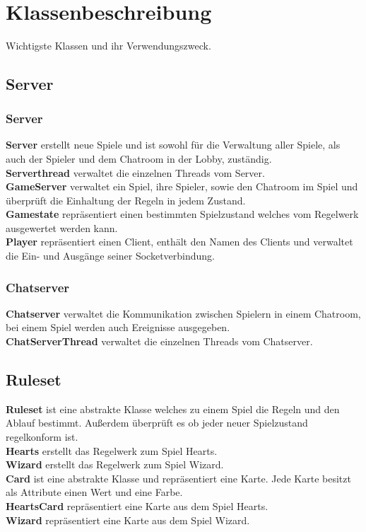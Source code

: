 \documentclass{article}
\begin{document}
\ \\
\section{Klassenbeschreibung}
Wichtigste Klassen und ihr Verwendungszweck.
	\subsection{Server}
		\subsubsection{Server}
			\textbf{Server} erstellt neue Spiele und ist sowohl für die Verwaltung aller Spiele, als auch der Spieler und dem Chatroom in der Lobby, zuständig. \\
			\textbf{Serverthread} verwaltet die einzelnen Threads vom Server. \\
			\textbf{GameServer} verwaltet ein Spiel, ihre Spieler, sowie den Chatroom im Spiel und überprüft die Einhaltung der Regeln in jedem Zustand. \\
			\textbf{Gamestate} repräsentiert einen bestimmten  Spielzustand welches vom Regelwerk ausgewertet werden kann.\\
			\textbf{Player} repräsentiert einen Client, enthält den Namen des Clients und verwaltet die Ein- und Ausgänge seiner Socketverbindung. \\
		\subsubsection{Chatserver}
			\textbf{Chatserver} verwaltet die Kommunikation zwischen Spielern in einem Chatroom, bei einem Spiel werden auch Ereignisse ausgegeben. \\
			\textbf{ChatServerThread} verwaltet die einzelnen Threads vom Chatserver.
	\subsection{Ruleset}
		\textbf{Ruleset} ist eine abstrakte Klasse welches zu einem Spiel die Regeln und den Ablauf bestimmt. Außerdem überprüft es ob jeder neuer Spielzustand regelkonform ist. \\
		\textbf{Hearts} erstellt das Regelwerk zum Spiel Hearts. \\
		\textbf{Wizard} erstellt das Regelwerk zum Spiel Wizard. \\
		\textbf{Card} ist eine abstrakte Klasse und repräsentiert eine Karte. Jede Karte besitzt als Attribute einen Wert und eine Farbe. \\
		\textbf{HeartsCard} repräsentiert eine Karte aus dem Spiel Hearts. \\
		\textbf{Wizard} repräsentiert eine Karte aus dem Spiel Wizard.
\end{document}
